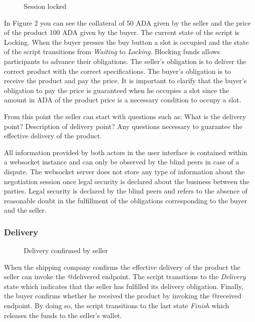 \documentclass[12pt]{article}
\begin{document}
\begin{figure}[ht]
  \centering
  
  \caption{Session locked}
  \label{fig:locking}
\end{figure}


In Figure 2 you can see the collateral of 50 ADA given by the seller and the price of the product 100 ADA given by the buyer. The current state of the script is Locking. 
When the buyer presses the buy button a slot is occupied and the state of the script transitions from \emph{Waiting} to \emph{Locking}.
Blocking funds allows participants to advance their obligations.
The seller's obligation is to deliver the correct product with the correct specifications. The buyer's obligation is to receive the product and pay the price.
It is important to clarify that the buyer's obligation to pay the price is guaranteed when he occupies a slot since the amount in ADA of the product price is a necessary condition to occupy a slot.

From this point the seller can start with questions such as: What is the delivery point? Description of delivery point? Any questions necessary to guarantee the effective delivery of the product.

All information provided by both actors in the user interface is contained within a websocket instance and can only be observed by the blind peers in case of a dispute.
The websocket server does not store any type of information about the negotiation session once legal security is declared about the business between the parties.
Legal security is declared by the blind peers and refers to the absence of reasonable doubt in the fulfillment of the obligations corresponding to the buyer and the seller.


\subsubsection { Delivery }


\begin{figure}[ht]
  \centering
  
  \caption{Delivery confirmed by seller}  
  \label{fig:delivered}
\end{figure}



When the shipping company confirms the effective delivery of the product the seller can invoke the @delivered endpoint.
The script transitions to the \emph{Delivery} state which indicates that the seller has fulfilled its delivery obligation.
Finally, the buyer confirms whether he received the product by invoking the @received endpoint. By doing so, the script transitions to the last state \emph{Finish} which releases the funds to the seller's wallet.
\end{document}
